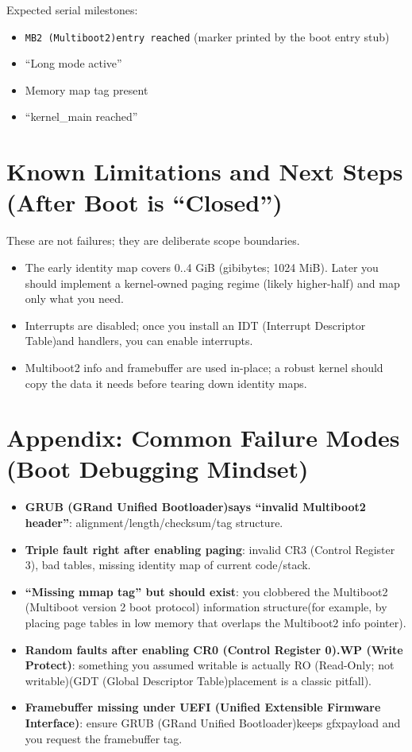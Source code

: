 \documentclass[11pt]{article}
\newcommand{\CRzero}{CR0 (Control Register 0)}
\newcommand{\CRthree}{CR3 (Control Register 3)}
\newcommand{\GDT}{GDT (Global Descriptor Table)}
\newcommand{\GiB}{GiB (gibibytes; 1024 MiB)}
\newcommand{\GRUB}{GRUB (GRand Unified Bootloader)}
\newcommand{\IDT}{IDT (Interrupt Descriptor Table)}
\newcommand{\MBtwoInfo}{Multiboot2 (Multiboot version 2 boot protocol) information structure}
\newcommand{\MBtwoShort}{MB2 (Multiboot2)}
\newcommand{\RO}{RO (Read-Only; not writable)}
\newcommand{\UEFI}{UEFI (Unified Extensible Firmware Interface)}
\newcommand{\WP}{WP (Write Protect)}
\begin{document}
Expected serial milestones:
\begin{itemize}
  \item \texttt{\MBtwoShort entry reached} (marker printed by the boot entry stub)
  \item ``Long mode active''
  \item Memory map tag present
  \item ``kernel\_main reached''
\end{itemize}

\newpage
\section{Known Limitations and Next Steps (After Boot is ``Closed'')}
These are not failures; they are deliberate scope boundaries.
\begin{itemize}
  \item The early identity map covers 0..4 \GiB. Later you should implement a kernel-owned paging regime (likely higher-half) and map only what you need.
  \item Interrupts are disabled; once you install an \IDT and handlers, you can enable interrupts.
  \item Multiboot2 info and framebuffer are used in-place; a robust kernel should copy the data it needs before tearing down identity maps.
\end{itemize}

\section{Appendix: Common Failure Modes (Boot Debugging Mindset)}
\begin{itemize}
  \item \textbf{\GRUB says ``invalid Multiboot2 header''}: alignment/length/checksum/tag structure.
  \item \textbf{Triple fault right after enabling paging}: invalid \CRthree, bad tables, missing identity map of current code/stack.
  \item \textbf{``Missing mmap tag'' but should exist}: you clobbered the \MBtwoInfo (for example, by placing page tables in low memory that overlaps the Multiboot2 info pointer).
  \item \textbf{Random faults after enabling \CRzero.\WP}: something you assumed writable is actually \RO (\GDT placement is a classic pitfall).
  \item \textbf{Framebuffer missing under \UEFI}: ensure \GRUB keeps gfxpayload and you request the framebuffer tag.
\end{itemize}
\end{document}
